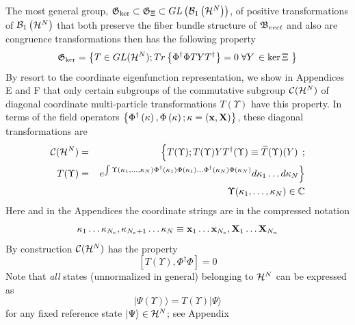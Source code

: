 The most general group, ${\frak G}_{\ker }\subset {\frak G}_{\Xi }\subset
GL\left( {\cal B}_{1}\left( {\cal H}^{N}\right) \right) $, of positive
transformations of ${\cal B}_{1}\left( {\cal H}^{N}\right) $ that both
preserve the fiber bundle structure of ${\frak B}_{vect}$ and also are
congruence transformations then has the following property 
\begin{equation}
{\frak G}_{\ker }=\left\{ T\in GL({\cal H}^{N});T{\sl r}\left\{ \Phi
^{\dagger }\Phi TYT^{\dagger }\right\} =0\;\forall Y\,\in \ker \Xi \text{ }%
\right\}  \label{GLkerXi}
\end{equation}%
By resort to the coordinate eigenfunction representation, we show in
Appendices E and F that only certain subgroups of the commutative subgroup $%
{\cal C}({\cal H}^{N})$ of diagonal coordinate multi-particle
transformations $T(\Upsilon )$ have this property. In terms of the field
operators $\left\{ \Phi ^{\dagger }\left( \kappa \right) ,\Phi \left( \kappa
\right) ;\kappa =\left( {\bf x},{\bf X}\right) \right\} $, these diagonal
transformations are 
\begin{eqnarray}
{\cal C}({\cal H}^{N}) &=&\left\{ T(\Upsilon );T(\Upsilon )YT^{\dagger
}(\Upsilon )\equiv \widehat{T}(\Upsilon )(Y)\right. \,;  \nonumber \\
T(\Upsilon ) &=&\left. e^{\int \Upsilon (\kappa _{1},\ldots ,\kappa
_{N})\Phi ^{\dagger }(\kappa _{1})\Phi (\kappa _{1})\ldots \Phi ^{\dagger
}(\kappa _{N})\Phi (\kappa _{N})}d\kappa _{1}\ldots d\kappa _{N}\right\} 
\nonumber \\
&&\Upsilon (\kappa _{1},\ldots ,\kappa _{N})\in {\Bbb C}
\end{eqnarray}%
Here and in the Appendices the coordinate strings are in the compressed
notation 
\begin{equation}
\kappa _{1}\ldots \kappa _{N_{e}},\kappa _{N_{e}+1}\ldots \kappa _{N}\equiv 
{\bf x}_{1}\ldots {\bf x}_{N_{e}},{\bf X}_{1}\ldots {\bf X}_{N_{n}}
\label{compressed}
\end{equation}%
By construction ${\cal C}({\cal H}^{N})$ has the property 
\begin{equation}
\left[ T(\Upsilon ),\Phi ^{\dagger }\Phi \right] =0
\end{equation}%
Note that {\em all} states (unnormalized in general) belonging to ${\cal H}%
^{N}$ can be expressed as 
\begin{equation}
|\Psi (\Upsilon )\rangle =T(\Upsilon )|\Psi \rangle
\end{equation}%
for any fixed reference state $|\Psi \rangle \in {\cal H}^{N}$; see Appendix
